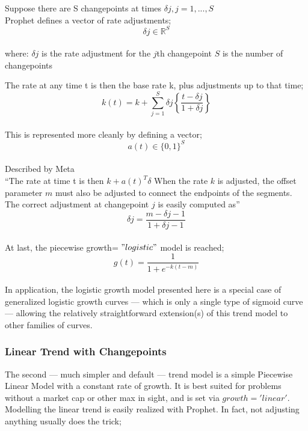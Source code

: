 Suppose there are S changepoints at times $\delta{j},j = 1,...,S $ \\

Prophet defines a vector of rate adjustments;
\begin{equation}
    \delta{j} \in \mathbb{R}^S
\end{equation} \\

where:
$\delta{j}$ is the rate adjustment for the $j$th changepoint
$S$ is the number of changepoints

The rate at any time t is then the base rate k, plus adjustments up to that time;
\begin{equation}
    k(t) = k + \sum_{j=1}^{S} \delta{j} \left\{ \frac{t-\delta{j}}{1+\delta{j}} \right\}
\end{equation} \\

This is represented more cleanly by defining a vector;
\begin{equation}
    a(t) \in \{0,1\} ^S
\end{equation} \\

Described by Meta \\
“The rate at time t is then $k+a(t)^T\delta$ When the rate $k$ is adjusted, the offset parameter $m$ must also be adjusted to connect the endpoints of the segments. The correct adjustment at changepoint $j$ is easily computed as”
\begin{equation}
    \delta{j} = \frac{m-\delta{j-1}}{1+\delta{j-1}}
\end{equation} \\

At last, the piecewise growth= $"logistic"$ model is reached;
\begin{equation}
    g(t) = \frac{1}{1+e^{-k(t-m)}}
\end{equation} \\

In application, the logistic growth model presented here is a special case of generalized logistic growth curves — which is only a single type of sigmoid curve — allowing the relatively straightforward extension(s) of this trend model to other families of curves.

\subsubsection{Linear Trend with Changepoints}

The second — much simpler and default — trend model is a simple Piecewise Linear Model with a constant rate of growth. It is best suited for problems without a market cap or other max in sight, and is set via $growth='linear'$.
Modelling the linear trend is easily realized with Prophet. In fact, not adjusting anything usually does the trick;

